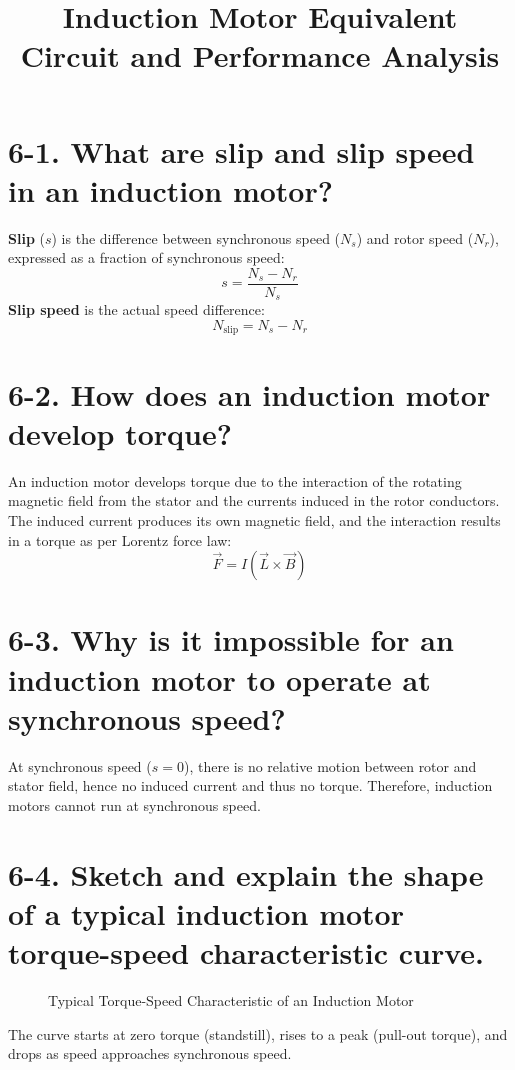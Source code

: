 \documentclass[a4paper,12pt]{article}
\title{Induction Motor Equivalent Circuit and Performance Analysis}
\author{}
\date{}
\begin{document}
	
	\maketitle
	

\section*{6-1. What are slip and slip speed in an induction motor?}
\textbf{Slip} ($s$) is the difference between synchronous speed ($N_s$) and rotor speed ($N_r$), expressed as a fraction of synchronous speed:
\begin{equation}
	s = \frac{N_s - N_r}{N_s}
\end{equation}
\textbf{Slip speed} is the actual speed difference:
\begin{equation}
	N_{\text{slip}} = N_s - N_r
\end{equation}

\section*{6-2. How does an induction motor develop torque?}
An induction motor develops torque due to the interaction of the rotating magnetic field from the stator and the currents induced in the rotor conductors. The induced current produces its own magnetic field, and the interaction results in a torque as per Lorentz force law:
\begin{equation}
	\vec{F} = I(\vec{L} \times \vec{B})
\end{equation}

\section*{6-3. Why is it impossible for an induction motor to operate at synchronous speed?}
At synchronous speed ($s = 0$), there is no relative motion between rotor and stator field, hence no induced current and thus no torque. Therefore, induction motors cannot run at synchronous speed.

\section*{6-4. Sketch and explain the shape of a typical induction motor torque-speed characteristic curve.}
\begin{figure}[H]
	\centering
	\caption{Typical Torque-Speed Characteristic of an Induction Motor}
\end{figure}
The curve starts at zero torque (standstill), rises to a peak (pull-out torque), and drops as speed approaches synchronous speed.
\end{document}
